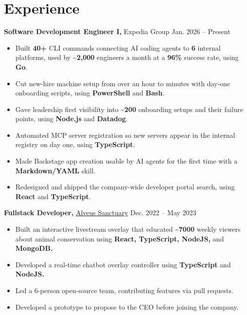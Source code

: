 \documentclass[letterpaper]{article}
\begin{document}
\section{Experience}
\textbf{Software Development Engineer I,} Expedia Group \hfill Jan. 2026 -- Present \\
\vspace{-5pt}
\begin{itemize}
    \item Built \textbf{40+} CLI commands connecting AI coding agents to \textbf{6} internal platforms, used by \textbf{\textasciitilde 2,000} engineers a month at a \textbf{96\%} success rate, using \textbf{Go}.
    \item Cut new-hire machine setup from over an hour to minutes with day-one onboarding scripts, using \textbf{PowerShell} and \textbf{Bash}.
    \item Gave leadership first visibility into \textbf{\textasciitilde 200} onboarding setups and their failure points, using \textbf{Node.js} and \textbf{Datadog}.
    \item Automated MCP server registration so new servers appear in the internal registry on day one, using \textbf{TypeScript}.
    \item Made Backstage app creation usable by AI agents for the first time with a \textbf{Markdown/YAML} skill.
    \item Redesigned and shipped the company-wide developer portal search, using \textbf{React} and \textbf{TypeScript}.
\end{itemize}

\textbf{Fullstack Developer,}
\href{https://www.alveussanctuary.org/}{Alveus Sanctuary} \hfill Dec. 2022 -- May 2023 \\
\vspace{-7.5pt}
\begin{itemize}
    \item Built an interactive livestream overlay that educated \textasciitilde{}\textbf{7000} weekly viewers about animal conservation using \textbf{React, TypeScript, NodeJS,} and \textbf{MongoDB.}
    \item Developed a real-time chatbot overlay controller using \textbf{TypeScript} and \textbf{NodeJS.}
    \item Led a 6-person open-source team, contributing features via pull requests.
    \item Developed a prototype to propose to the CEO before joining the company.
\end{itemize}
\end{document}
